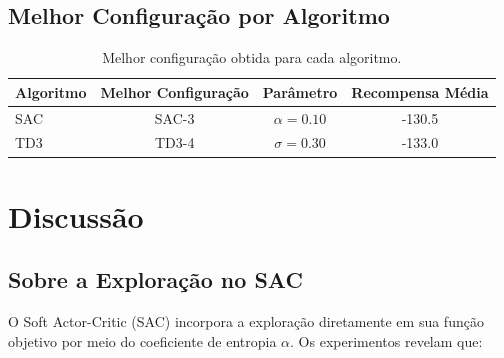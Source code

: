 \documentclass{Supervised_Reinforcement_Learningqsport}
\begin{document}
\subsection{Melhor Configuração por Algoritmo}

\begin{table}[H]
\centering
\caption{Melhor configuração obtida para cada algoritmo.}
\label{tab:best_configuration}
\begin{tabular}{lccc}
\toprule
\textbf{Algoritmo} & \textbf{Melhor Configuração} & \textbf{Parâmetro} & \textbf{Recompensa Média} \\
\midrule
SAC & SAC-3 & $\alpha=0.10$ & -130.5 \\
TD3 & TD3-4 & $\sigma=0.30$ & -133.0 \\
\bottomrule
\end{tabular}
\end{table}

\section{Discussão}

\subsection{Sobre a Exploração no SAC}

O Soft Actor-Critic (SAC) incorpora a exploração diretamente em sua função objetivo por meio do coeficiente de entropia $\alpha$. Os experimentos revelam que:
\end{document}
